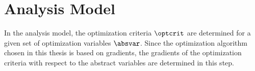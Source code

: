 \documentclass[../main.tex]{subfiles}
\begin{document}
\section{Analysis Model}\label{sec:analysis_model}
In the analysis model, the optimization criteria $\optcrit$ are determined for a given set of optimization variables $\absvar$. Since the optimization algorithm chosen in this thesis is based on gradients, the gradients of the optimization criteria with respect to the abstract variables are determined in this step.
\end{document}
